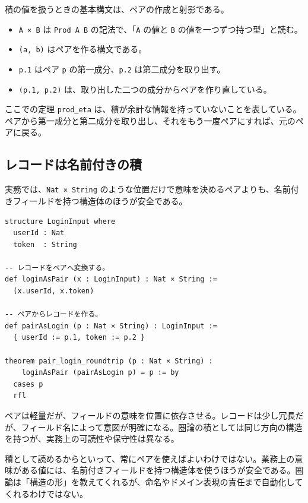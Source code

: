 \begin{syntaxbox}
積の値を扱うときの基本構文は、ペアの作成と射影である。
\begin{itemize}
\item \texttt{A × B} は \texttt{Prod A B} の記法で、「\texttt{A} の値と \texttt{B} の値を一つずつ持つ型」と読む。
\item \texttt{(a, b)} はペアを作る構文である。
\item \texttt{p.1} はペア \texttt{p} の第一成分、\texttt{p.2} は第二成分を取り出す。
\item \texttt{(p.1, p.2)} は、取り出した二つの成分からペアを作り直している。
\end{itemize}
\end{syntaxbox}

ここでの定理 \texttt{prod\_eta} は、積が余計な情報を持っていないことを表している。ペアから第一成分と第二成分を取り出し、それをもう一度ペアにすれば、元のペアに戻る。

\subsection{レコードは名前付きの積}

実務では、\texttt{Nat × String} のような位置だけで意味を決めるペアよりも、名前付きフィールドを持つ構造体のほうが安全である。

\begin{listing}[htbp]
\begin{verbatim}
structure LoginInput where
  userId : Nat
  token  : String

-- レコードをペアへ変換する。
def loginAsPair (x : LoginInput) : Nat × String :=
  (x.userId, x.token)

-- ペアからレコードを作る。
def pairAsLogin (p : Nat × String) : LoginInput :=
  { userId := p.1, token := p.2 }

theorem pair_login_roundtrip (p : Nat × String) :
    loginAsPair (pairAsLogin p) = p := by
  cases p
  rfl
\end{verbatim}
\caption{構造体は名前付きの積として読める}
\label{lst:ch07_record_as_product}
\end{listing}

ペアは軽量だが、フィールドの意味を位置に依存させる。レコードは少し冗長だが、フィールド名によって意図が明確になる。圏論の積としては同じ方向の構造を持つが、実務上の可読性や保守性は異なる。

\begin{warningbox}
積として読めるからといって、常にペアを使えばよいわけではない。業務上の意味がある値には、名前付きフィールドを持つ構造体を使うほうが安全である。圏論は「構造の形」を教えてくれるが、命名やドメイン表現の責任まで自動化してくれるわけではない。
\end{warningbox}

